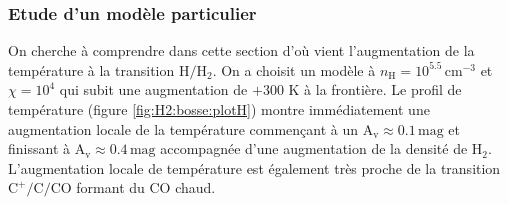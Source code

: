  

\subsubsection{Etude d'un modèle particulier}

On cherche à comprendre dans cette section d'où vient l'augmentation de la température à la transition $\mathrm{H}/\mathrm{H}_2$. On a choisit un modèle à $n_\mathrm{H} = 10^{5.5} \,\mathrm{cm}^{-3}$ et $\chi = 10^4$ qui subit une augmentation de $+300$ K à la frontière. Le profil de température (figure \ref{fig:H2:bosse:plotH}) montre immédiatement une augmentation locale de la température commençant à un $\mathrm{A}_\mathrm{v} \approx 0.1 \,\mathrm{mag}$ et finissant à $\mathrm{A}_\mathrm{v} \approx 0.4 \,\mathrm{mag}$ accompagnée d'une augmentation de la densité de $\mathrm{H}_2$. L'augmentation locale de température est également très proche de la transition $\mathrm{C}^+/\mathrm{C}/\mathrm{CO}$ formant du $\mathrm{CO}$ chaud. \newline 

